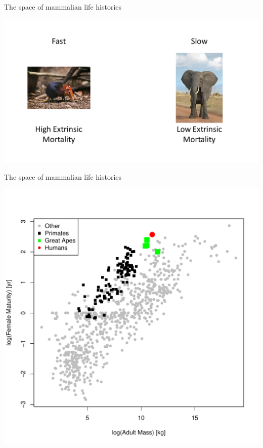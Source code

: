 \documentclass{beamer}
\begin{document}
\begin{frame}{The space of mammalian life histories}
  \begin{center}
    \includegraphics[width=1\textwidth]{fast_slow.pdf}
  \end{center}
\end{frame}

\begin{frame}{The space of mammalian life histories}
  \begin{center}
    \includegraphics[width=.7\textwidth]{female_maturity.pdf}
  \end{center}
\end{frame}
\end{document}
